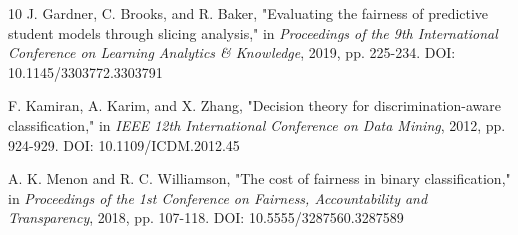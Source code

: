 \documentclass[10pt,journal,compsoc]{IEEEtran}
\begin{document}
\begin{thebibliography}{10}
J. Gardner, C. Brooks, and R. Baker, "Evaluating the fairness of predictive student models through slicing analysis," in \textit{Proceedings of the 9th International Conference on Learning Analytics & Knowledge}, 2019, pp. 225-234. DOI: 10.1145/3303772.3303791

F. Kamiran, A. Karim, and X. Zhang, "Decision theory for discrimination-aware classification," in \textit{IEEE 12th International Conference on Data Mining}, 2012, pp. 924-929. DOI: 10.1109/ICDM.2012.45

A. K. Menon and R. C. Williamson, "The cost of fairness in binary classification," in \textit{Proceedings of the 1st Conference on Fairness, Accountability and Transparency}, 2018, pp. 107-118. DOI: 10.5555/3287560.3287589
\end{thebibliography}
\end{document}
